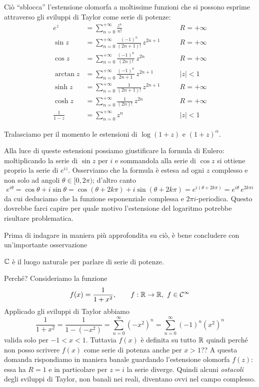 Ciò ``sblocca'' l'estensione olomorfa a moltissime funzioni che si possono esprime attraverso gli sviluppi di Taylor come serie di potenze:
\begin{align*}
e^z&=\sum_{n=0}^{+\infty}\frac{z^n}{n!} \qquad &R=+\infty \\
\sin z &= \sum_{n=0}^{+\infty}\frac{(-1)^n}{(2n+1)!}\,z^{2n+1} \qquad &R=+\infty \\
\cos z &= \sum_{n=0}^{+\infty}\frac{(-1)^n}{(2n)!}\,z^{2n} \qquad &R=+\infty \\
\arctan z &= \sum_{n=0}^{+\infty}\frac{(-1)^n}{2n+1}\,z^{2n+1} \qquad &|z|<1 \\
\sinh z &= \sum_{n=0}^{+\infty}\frac{1}{(2n+1)!}\,z^{2n+1} \qquad &R=+\infty \\
\cosh z &= \sum_{n=0}^{+\infty}\frac{1}{(2n)!}\,z^{2n} \qquad &R=+\infty \\
\frac{1}{1-z}&=\sum_{n=0}^{+\infty}z^n  \qquad &|z|<1
\end{align*}

Tralasciamo per il momento le estensioni di $\log(1+z)$ e $(1+z)^\alpha$.

Alla luce di queste estensioni possiamo giustificare la formula di Eulero: moltiplicando la serie di $\sin z$ per $i$ e sommandola alla serie di $\cos z$ si ottiene proprio la serie di $e^{iz}$. Osserviamo che la formula è estesa ad ogni $z$ complesso e non solo ad angoli $\theta\in[0,2\pi)$; d'altro canto
$$
e^{i\theta}=\cos\theta+i\sin\theta=\cos(\theta+2k\pi)+i\sin(\theta+2k\pi)=e^{i(\theta+2k\pi)}=e^{i\theta}\,e^{2k\pi i}
$$
da cui deduciamo che la funzione esponenziale complessa e $2\pi i$-periodica. Questo dovrebbe farci capire per quale motivo l'estensione del logaritmo potrebbe risultare problematica.

Prima di indagare in maniera più approfondita su ciò, è bene concludere con un'importante osservazione
\begin{lemma}
$\mathbb{C}$ è il luogo naturale per parlare di serie di potenze.
\end{lemma}
Perché? Consideriamo la funzione 
$$f(x)=\frac{1}{1+x^2}, \qquad f:\RR\to\RR,\ f\in\Cc^\infty$$
Applicado gli sviluppi di Taylor abbiamo
$$\frac{1}{1+x^2}=\frac{1}{1-(-x^2)}=\sum_{n=0}^\infty(-x^2)^n=\sum_{n=0}^\infty(-1)^n(x^2)^n$$
valida solo per $-1<x<1$. Tuttavia $f(x)$ è definita su tutto $\mathbb{R}$ quindi perché non posso scrivere $f(x)$ come serie di potenza anche per $x>1$?? A questa domanda rispondiamo in maniera banale guardando l'estensione olomorfa $f(z)$: essa ha $R=1$ e in particolare per $z=i$ la serie diverge. Quindi alcuni \textit{ostacoli} degli sviluppi di Taylor, non banali nei reali, diventano ovvi nel campo complesso.


